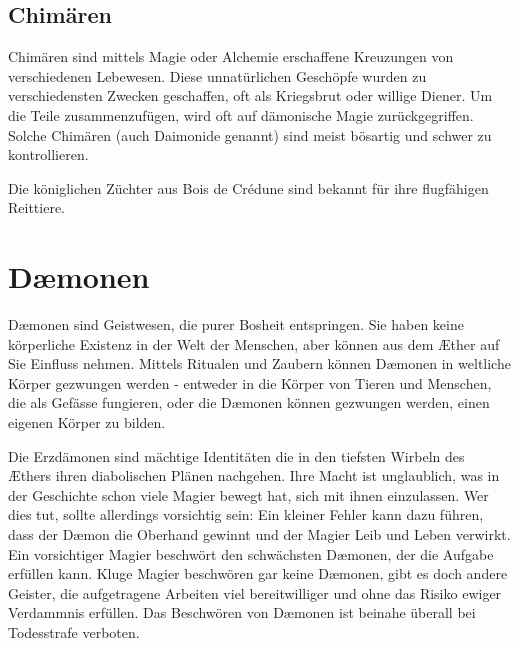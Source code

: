 \documentclass[10pt,twoside,twocolumn,openany]{book}
\begin{document}
\subsection{Chimären}


Chimären sind mittels Magie oder Alchemie erschaffene Kreuzungen von verschiedenen Lebewesen. Diese unnatürlichen Geschöpfe wurden zu verschiedensten Zwecken geschaffen, oft als Kriegsbrut oder willige Diener. Um die Teile zusammenzufügen, wird oft auf dämonische Magie zurückgegriffen. Solche Chimären (auch Daimonide genannt) sind meist bösartig und schwer zu kontrollieren.

Die königlichen Züchter aus Bois de Crédune sind bekannt für ihre flugfähigen Reittiere.





\section{D\ae monen}
D\ae monen sind Geistwesen, die purer Bosheit entspringen. Sie haben keine körperliche Existenz in der Welt der Menschen, aber können aus dem \AE ther auf Sie Einfluss nehmen. Mittels Ritualen und Zaubern können D\ae monen in weltliche Körper gezwungen werden - entweder in die Körper von Tieren und Menschen, die als Gefässe fungieren, oder die D\ae monen können gezwungen werden, einen eigenen Körper zu bilden.

Die Erzdämonen sind mächtige Identitäten die in den tiefsten Wirbeln des \AE thers ihren diabolischen Plänen nachgehen. Ihre Macht ist unglaublich, was in der Geschichte schon viele Magier bewegt hat, sich mit ihnen einzulassen. Wer dies tut, sollte allerdings vorsichtig sein: Ein kleiner Fehler kann dazu führen, dass der D\ae mon die Oberhand gewinnt und der Magier Leib und Leben verwirkt. Ein vorsichtiger Magier beschwört den schwächsten D\ae monen, der die Aufgabe erfüllen kann. Kluge Magier beschwören gar keine D\ae monen, gibt es doch andere Geister, die aufgetragene Arbeiten viel bereitwilliger und ohne das Risiko ewiger Verdammnis erfüllen. Das Beschwören von D\ae monen ist beinahe überall bei Todesstrafe verboten.
\end{document}
